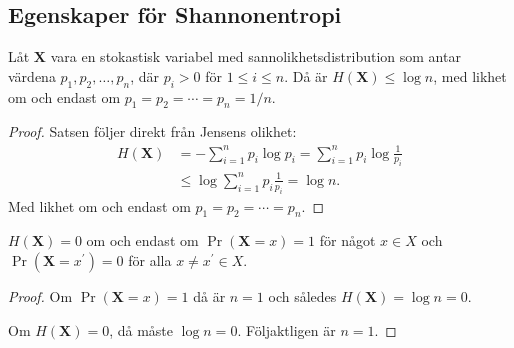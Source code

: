 \documentclass{beamer}
\theoremstyle{definition}
\let\stoch\mathbf{}
\begin{document}
\subsection{Egenskaper för Shannonentropi}

\begin{frame}{\insertsubsectionhead}
  \begin{theorem}
    Låt \(\stoch X\) vara en stokastisk variabel med sannolikhetsdistribution 
    som antar värdena \(p_1, p_2,\ldots, p_n\), där \(p_i > 0\) för \(1\leq 
    i\leq n\).
    Då är \(H(\stoch X)\leq \log n\), med likhet om och endast om \(p_1 = p_2 
    = \cdots = p_n = 1/n\).
  \end{theorem}
\end{frame}

\begin{frame}{\insertsubsectionhead}
  \begin{proof}
    Satsen följer direkt från Jensens olikhet:
    \begin{align*}
      H(\stoch X) &= -\sum_{i=1}^n p_i\log p_i = \sum_{i=1}^n 
      p_i\log\frac{1}{p_i} \\
      &\leq \log\sum_{i=1}^n p_i\frac{1}{p_i} = \log n.
    \end{align*}
    Med likhet om och endast om \(p_1 = p_2 = \cdots = p_n\).
  \end{proof}
\end{frame}

\begin{frame}{\insertsubsectionhead}
  \begin{corollary}
    \(H(\stoch X) = 0\) om och endast om \(\Pr(\stoch X = x) = 1\) för något 
    \(x\in X\) och \(\Pr(\stoch X = x^\prime) = 0\) för alla \(x\neq x^\prime 
    \in X\).
  \end{corollary}

  \begin{proof}
    Om \(\Pr(\stoch X = x) = 1\) då är \(n = 1\) och således \(H(\stoch X) 
    = \log n = 0\).

    Om \(H(\stoch X) = 0\), då måste \(\log n = 0\).
    Följaktligen är \(n = 1\).
  \end{proof}
\end{frame}
\end{document}
